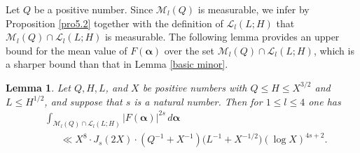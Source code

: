 \documentclass{amsart}%
\numberwithin{equation}{section}
\newtheorem{lemma}[theorem]{Lemma}
\theoremstyle{remark}
\newcommand{\1}{\mathbbm{1}}
\begin{document}
Let $Q$ be a positive number. Since $\mathcal{M}_l(Q)$ is measurable, we infer by Proposition \ref{pro5.2} together with the definition of $\mathcal{L}_{l}(L;H)$ that $\mathcal{M}_l(Q)\cap \mathcal{L}_{l}(L;H)$ is measurable. The following lemma provides an upper bound for the mean value of $F(\boldsymbol{\alpha})$ over the set $\mathcal{M}_l(Q)\cap \mathcal{L}_{l}(L;H)$, which is a sharper bound than that in Lemma \ref{basic minor}.

\begin{lemma}\label{improved minor}
    Let $Q, H, L$, and $X$ be positive numbers with $Q \leq H\leq X^{3/2}$ and $L\leq H^{1/2}$, and suppose that $s $ is a natural number. Then for $1\leq l\leq 4$ one has 
    \begin{equation*}\label{sharp bound for T}
    \begin{aligned}
        & \int_{\mathcal{M}_l(Q)\cap \mathcal{L}_{l}(L;H)} |F(\boldsymbol{\alpha})|^{2s}\, d\boldsymbol{\alpha}  \\
        & \ \ \ \ \ \ \ \ll X^{8} \cdot J_s(2X)\cdot \left(Q^{-1}+X^{-1}\right)\bigl(L^{-1}+X^{-1/2}\bigr)(\log X)^{4s+2}.
    \end{aligned}
    \end{equation*}
\end{lemma}
\end{document}
